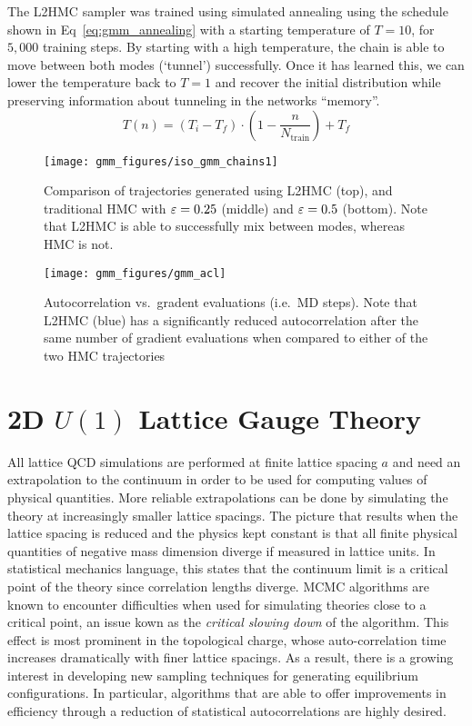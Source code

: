 \documentclass[main.tex]{subfiles}
\begin{document}
%
The L2HMC sampler was trained using simulated annealing using the schedule shown in Eq~\ref{eq:gmm_annealing} with a
starting temperature of $T = 10$, for $5,000$ training steps.
%
By starting with a high temperature, the chain is able to move between both modes (`tunnel') successfully.
%
Once it has learned this, we can lower the temperature back to $T = 1$ and recover the initial distribution while
preserving information about tunneling in the networks ``memory''.
%
\begin{equation}
  T(n) = {\left(T_{i} - T_{f}\right)} \cdot {\left(1 - \frac{n}{N_{\mathrm{train}}}\right)} + T_{f}
  \label{eq:gmm_annealing}
\end{equation}
%
\begin{figure}[htbp]
    \centering
    \texttt{[image: gmm\_figures/iso\_gmm\_chains1]}
    \caption{Comparison of trajectories generated using L2HMC (top), and
        traditional HMC with ${\varepsilon} = 0.25$ (middle) and ${\varepsilon} = 0.5$ (bottom).
        Note that L2HMC is able to successfully mix between modes, whereas HMC
        is not.}%
\label{fig:gmm_trajectories}
\end{figure}
%
\begin{figure}[htbp]
    \centering
    \texttt{[image: gmm\_figures/gmm\_acl]}
    \caption{Autocorrelation vs.\ gradent evaluations (i.e.\ MD steps). Note that L2HMC (blue) has a significantly
      reduced autocorrelation after the same number of gradient evaluations when compared to either of the two HMC
    trajectories}%
\label{fig:gmm_autocorrelation}
\end{figure}
%
\section{2D \texorpdfstring{$U(1)$}{U (1)} Lattice Gauge Theory}%
\label{sec:l2hmc_u1}
All lattice QCD simulations are performed at finite lattice spacing $a$ and need an extrapolation to the continuum in
order to be used for computing values of physical quantities.
%
More reliable extrapolations can be done by simulating the theory at increasingly smaller lattice spacings.
%
The picture that results when the lattice spacing is reduced and the physics kept constant is that all finite physical
quantities of negative mass dimension diverge if measured in lattice units.
%
In statistical mechanics language, this states that the continuum limit is a critical point of the theory since
correlation lengths diverge.
%
MCMC algorithms are known to encounter difficulties when used for simulating theories close to a critical point, an
issue kown as the \emph{critical slowing down} of the algorithm.
%
This effect is most prominent in the topological charge, whose auto-correlation time increases dramatically with finer
lattice spacings.
%
As a result, there is a growing interest in developing new sampling techniques for generating equilibrium
configurations. 
%
In particular, algorithms that are able to offer improvements in efficiency through a reduction of statistical
autocorrelations are highly desired. 
%
\end{document}
